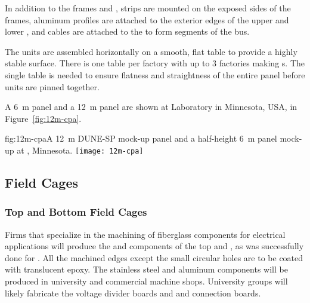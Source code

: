 In addition to the frames and , 
 strips are mounted on the exposed sides of the \frfour frames, aluminum profiles are attached to the exterior edges of the upper and lower , 
and cables are attached to the  to form segments of the  bus.  

The  units are assembled horizontally on a smooth, flat table to provide a highly stable surface. There is one table per factory with up to 3 factories making s. The single table is needed to ensure flatness and straightness of the entire panel before units are pinned together.

A \SI{6}{\m}   panel and a \SI{12}{\m}   panel are shown at  Laboratory in Minnesota, USA,  in Figure~\ref{fig:12m-cpa}.


\begin{dunefigure}{fig:12m-cpa}{A \SI{12}{\m} DUNE-SP  mock-up panel and a %
half-height \SI{6}{\m}  panel mock-up at , Minnesota.}  %
\texttt{[image: 12m-cpa]}
\end{dunefigure}

\subsection{Field Cages}
\label{sec:fdsp-hv-prod-fc}


\subsubsection{Top and Bottom Field Cages}
\label{sec:fdsp-hv-prod-fc-tb}

Firms that specialize in the machining of fiberglass components for electrical applications will produce the  and \frfour components of the top and , as was successfully done for . 
All the machined edges except the small circular holes are to be coated with translucent epoxy. The stainless steel and aluminum components will be produced in university and commercial machine shops. University groups will likely fabricate the voltage divider boards and  and  connection boards.


